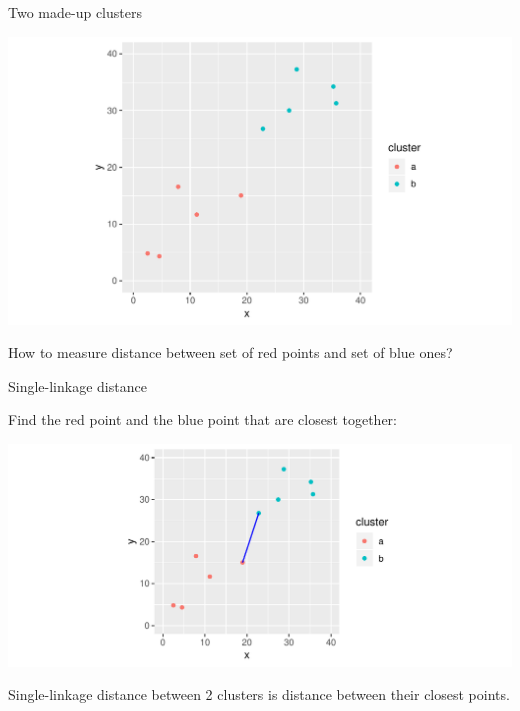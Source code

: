 \documentclass[unknownkeysallowed]{beamer}\usepackage[]{graphicx}\usepackage[]{color}
\makeatletter
\def\maxwidth{ %
  \ifdim\Gin@nat@width>\linewidth
    \linewidth
  \else
    \Gin@nat@width
  \fi
}
\newenvironment{knitrout}{}{} %
\makeatother
\begin{document}
\begin{frame}[fragile]{Two made-up clusters}
  
\begin{knitrout}
\color{fgcolor}
\includegraphics[width=\maxwidth]{figure/unnamed-chunk-317-1} 

\end{knitrout}

How to measure distance between set of red points and set of blue
ones? 
  
\end{frame}

\begin{frame}[fragile]{Single-linkage distance}
  
  Find the red point and the blue point that are closest together:
  
\begin{knitrout}
\color{fgcolor}
\includegraphics[width=\maxwidth]{figure/unnamed-chunk-318-1} 

\end{knitrout}

Single-linkage distance between 2 clusters is distance between their
closest points.
  
\end{frame}
\end{document}
